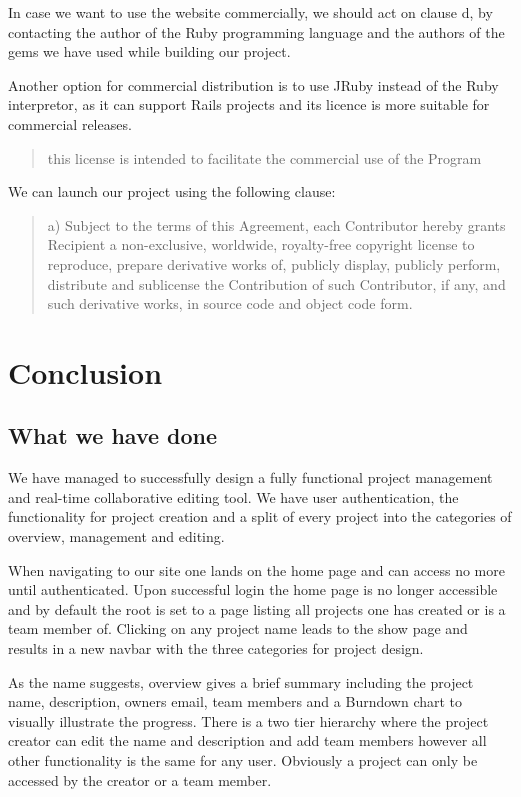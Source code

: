 \documentclass[a4wide, 11pt]{article}
\begin{document}
In case we want to use the website commercially, we should act on clause
d, by contacting the author of the Ruby programming language and the authors of
the gems we have used while building our project.

Another option for commercial distribution is to use JRuby instead of the Ruby
interpretor, as it can support Rails projects and its licence is more suitable
for commercial releases.

\begin{quote}
this license is intended to facilitate the commercial use of the Program
\cite{JRubylicence}
\end{quote}

We can launch our project using the following clause:

\begin{quote}
a) Subject to the terms of this Agreement, each Contributor hereby grants
Recipient a non-exclusive, worldwide, royalty-free copyright license to
reproduce, prepare derivative works of, publicly display, publicly perform,
distribute and sublicense the Contribution of such Contributor, if any, and
such derivative works, in source code and object code form.
\cite{JRubylicence}
\end{quote}
\clearpage

\section{Conclusion}

\subsection{What we have done}
We have managed to successfully design a fully functional project management and real-time collaborative editing tool. We have user authentication, the functionality for project creation and a  split of every project into the categories of overview, management and editing. 

When navigating to our site one lands on the home page and can access no more until authenticated. Upon successful login the home page is no longer accessible and by default the root is set to a page listing all projects one has created or is a team member of. Clicking on any project name leads to the show page and results in a new navbar with the three categories for project design.

As the name suggests, overview gives a brief summary including the project name, description, owners email, team members and a Burndown chart to visually illustrate the progress. There is a two tier hierarchy where the project creator can edit the name and description and add team members however all other functionality is the same for any user. Obviously a project can only be accessed by the creator or a team member. 
\end{document}
